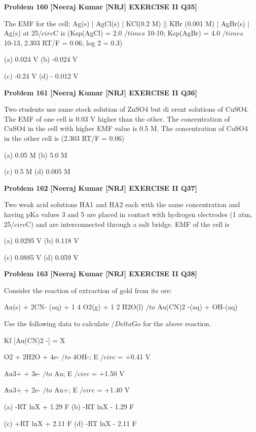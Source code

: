 \begin{problembox}
\textbf{Problem 160} \hfill \textbf{[Neeraj Kumar [NRJ] EXERCISE II Q35]}
\label{q:ext-nrj_all_questions-160}

The EMF for the cell: Ag(s) | AgCl(s) | KCl(0.2 
M) || KBr (0.001 M) | AgBr(s) | Ag(s) at 25$/circ$C is 
(Ksp(AgCl) = 2.0 $/times$ 10-10; Ksp(AgBr) = 4.0 $/times$ 10-13, 
2.303 RT/F = 0.06, log 2 = 0.3)
 
 (a) 0.024 V 
(b) -0.024 V
 
 (c) -0.24 V 
(d) - 0.012 V
\end{problembox}

\begin{problembox}
\textbf{Problem 161} \hfill \textbf{[Neeraj Kumar [NRJ] EXERCISE II Q36]}
\label{q:ext-nrj_all_questions-161}

Two students use same stock solution of ZnSO4 
but di  erent solutions of CuSO4. The EMF 
of one cell is 0.03 V higher than the other. The 
concentration of CuSO4 in the cell with higher 
EMF value is 0.5 M. The concentration of CuSO4 
in the other cell is (2.303 RT/F = 0.06)
 
 (a) 0.05 M 
(b) 5.0 M
 
 (c) 0.5 M 
(d) 0.005 M
\end{problembox}

\begin{problembox}
\textbf{Problem 162} \hfill \textbf{[Neeraj Kumar [NRJ] EXERCISE II Q37]}
\label{q:ext-nrj_all_questions-162}

Two weak acid solutions HA1 and HA2 each with 
the same concentration and having pKa values 
3 and 5 are placed in contact with hydrogen 
electrodes (1 atm, 25$/circ$C) and are interconnected 
through a salt bridge. EMF of the cell is
 
 (a) 0.0295 V 
(b) 0.118 V
 
 (c) 0.0885 V 
(d) 0.059 V
\end{problembox}

\begin{problembox}
\textbf{Problem 163} \hfill \textbf{[Neeraj Kumar [NRJ] EXERCISE II Q38]}
\label{q:ext-nrj_all_questions-163}

Consider the reaction of extraction of gold from 
its ore:
 
   Au(s) + 2CN- (aq) + 1
4 O2(g) + 1
2 H2O(l) $/to$ 
Au(CN)2
-(aq) + OH-(aq)
 
 Use the following data to calculate $/Delta$Go for the 
above reaction.
 
  Kf [Au(CN)2
-] 
= X
 
  O2 + 2H2O + 4e- $/to$ 4OH-;  E $/circ$ = +0.41 V
 
  Au3+ + 3e- $/to$ Au;                E $/circ$ = +1.50 V
 
  Au3+ + 2e- $/to$ Au+;              E $/circ$ = +1.40 V
 
 (a) -RT lnX + 1.29 F 
(b) -RT lnX - 1.29 F
 
 (c) +RT lnX + 2.11 F 
(d) -RT lnX - 2.11 F
\end{problembox}

